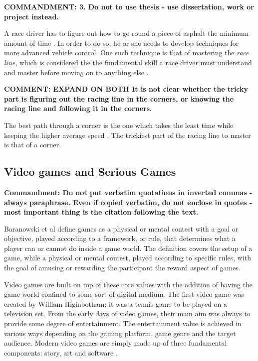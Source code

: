 \documentclass{article}
\begin{document}
\textbf{COMMANDMENT: 3. Do not to use thesis - use dissertation, work or project instead.}

A race driver has to figure out how to go round a piece of asphalt the minimum amount of time \cite{GoingFaster}. In order to do so, he or she needs to develop techniques for more advanced vehicle control. One such technique is that of mastering the \emph{race line}, which is considered the the fundamental skill a race driver must understand and master before moving on to anything else \cite{GoingFaster}. 

\textbf{COMMENT: EXPAND ON BOTH It is not clear whether the tricky part is figuring out the racing line in the corners, or knowing the racing line and following it in the corners.}

The best path through a corner is the one which takes the least time while keeping the higher average speed \cite{beckman1991physics}. The trickiest part of the racing line to master is that of a corner.

\subsection{Video games and Serious Games}

\textbf{Commandment: Do not put verbatim quotations in inverted commas - always paraphrase. Even if copied verbatim, do not enclose in quotes - most important thing is the citation following the text.}

Baranowski et al \cite{yuserious} define games as a physical or mental contest with a goal or objective, played according to a framework, or rule, that determines what a player can or cannot do inside a game world. The definition covers the setup of a game, while a physical or mental contest, played according to specific rules, with the goal of amusing or rewarding the participant the reward aspect of games.

Video games are built on top of these core values with the addition of having the game world confined to some sort of digital medium. The first video game was created by William Higinbotham; it was a tennis game to be played on a television set\cite{stanton2015brief}. From the early days of video games, their main aim was always to provide some degree of entertainment. The entertainment value is achieved in various ways depending on the gaming platform, game genre and the target audience. Modern video games are simply made up of three fundamental components: story, art and software \cite{zyda2005visual}.
\end{document}
